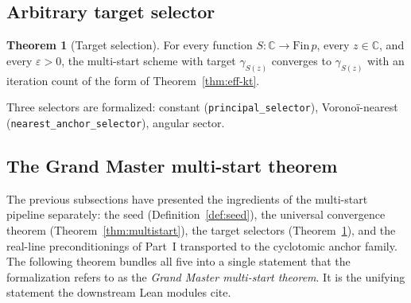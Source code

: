 \documentclass[11pt,a4paper]{article}
\theoremstyle{definition}
\newtheorem{theorem}{Theorem}[section]
\begin{document}
\subsection{Arbitrary target selector}

\begin{theorem}[Target selection]\label{thm:galois-equiv}
For every function $S : \mathbb{C} \to \mathrm{Fin}\,p$, every $z \in \mathbb{C}$, and every $\varepsilon > 0$, the multi-start scheme with target $\gamma_{S(z)}$ converges to $\gamma_{S(z)}$ with an iteration count of the form of Theorem~\ref{thm:eff-kt}.
\end{theorem}

Three selectors are formalized: constant (\texttt{principal\_selector}), Voronoï-nearest (\texttt{nearest\_anchor\_selector}), angular sector.

\subsection{The Grand Master multi-start theorem}
\label{sec:grand-master}

The previous subsections have presented the ingredients of the multi-start pipeline separately: the seed (Definition~\ref{def:seed}), the universal convergence theorem (Theorem~\ref{thm:multistart}), the target selectors (Theorem~\ref{thm:galois-equiv}), and the real-line preconditionings of Part~I transported to the cyclotomic anchor family. The following theorem bundles all five into a single statement that the formalization refers to as the \emph{Grand Master multi-start theorem}. It is the unifying statement the downstream Lean modules cite.
\end{document}
